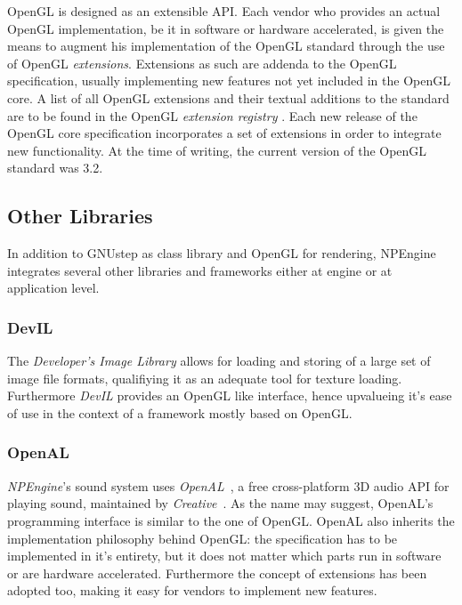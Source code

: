 OpenGL is designed as an extensible API. Each vendor who provides an actual
OpenGL implementation, be it in software or hardware accelerated, is given the
means to augment his implementation of the OpenGL standard through the use of
OpenGL \textit{extensions}. Extensions as such are addenda to the OpenGL
specification, usually implementing new features not yet included in the OpenGL
core. A list of all OpenGL extensions and their textual additions to the
standard are to be found in the OpenGL \textit{extension registry}
\cite{misc:opengl-registry}. Each new release of the OpenGL core specification
incorporates a set of extensions in order to integrate new functionality. At the
time of writing, the current version of the OpenGL standard was 3.2.

\subsection{Other Libraries}

In addition to GNUstep as class library and OpenGL for rendering, NPEngine
integrates several other libraries and frameworks either at engine or at
application level.

\subsubsection{DevIL}

The \textit{Developer's Image Library}\cite{misc:devil} allows for loading and
storing of a large set of image file formats, qualifiying it as an adequate
tool for texture loading. Furthermore \textit{DevIL} provides an OpenGL like
interface, hence upvalueing it's ease of use in the context of a framework
mostly based on OpenGL.

\subsubsection{OpenAL}

\textit{NPEngine}'s sound system uses \textit{OpenAL}~\cite{misc:openal}, a free
cross-platform 3D audio API for playing sound, maintained by
\textit{Creative}~\cite{misc:creative}. As the name may suggest, OpenAL's
programming interface is similar to the one of OpenGL. OpenAL also inherits
the implementation philosophy behind OpenGL: the specification has to be
implemented in it's entirety, but it does not matter which parts run in software
or are hardware accelerated. Furthermore the concept of extensions has been
adopted too, making it easy for vendors to implement new features.

